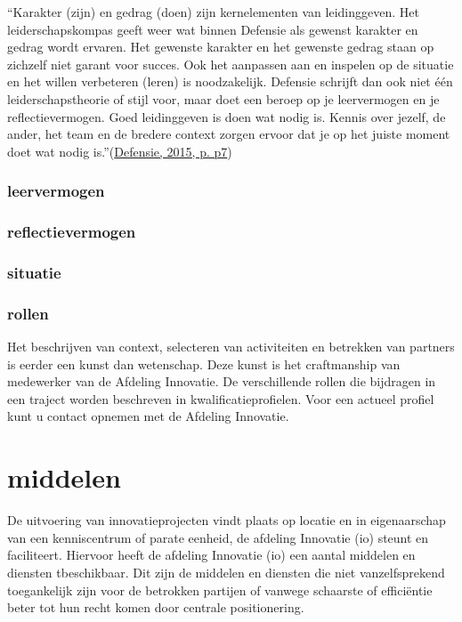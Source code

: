 \documentclass[
]{book}
\begin{document}
``Karakter (zijn) en gedrag (doen) zijn kernelementen van leidinggeven. Het leiderschapskompas geeft weer wat binnen Defensie als gewenst karakter en gedrag wordt ervaren. Het gewenste karakter en het gewenste gedrag staan op zichzelf niet garant voor succes. Ook het aanpassen aan en inspelen op de situatie en het willen verbeteren (leren) is noodzakelijk. Defensie schrijft dan ook niet één leiderschapstheorie of stijl voor, maar doet een beroep op je leervermogen en je reflectievermogen. Goed leidinggeven is doen wat nodig is. Kennis over jezelf, de ander, het team en de bredere context zorgen ervoor dat je op het juiste moment doet wat nodig is.''(\protect\hyperlink{ref-ministerie_van_defensie_visie_2015}{Defensie, 2015, p. p7})

\hypertarget{leervermogen}{%
\subsubsection{leervermogen}\label{leervermogen}}

\hypertarget{reflectievermogen}{%
\subsubsection{reflectievermogen}\label{reflectievermogen}}

\hypertarget{situatie}{%
\subsubsection{situatie}\label{situatie}}

\hypertarget{rollen}{%
\subsubsection{rollen}\label{rollen}}

Het beschrijven van context, selecteren van activiteiten en betrekken van partners is eerder een kunst dan wetenschap. Deze kunst is het craftmanship van medewerker van de Afdeling Innovatie. De verschillende rollen die bijdragen in een traject worden beschreven in kwalificatieprofielen. Voor een actueel profiel kunt u contact opnemen met de Afdeling Innovatie.

\hypertarget{middelen}{%
\section{middelen}\label{middelen}}

De uitvoering van innovatieprojecten vindt plaats op locatie en in eigenaarschap van een kenniscentrum of parate eenheid, de afdeling Innovatie (io) steunt en faciliteert. Hiervoor heeft de afdeling Innovatie (io) een aantal middelen en diensten tbeschikbaar. Dit zijn de middelen en diensten die niet vanzelfsprekend toegankelijk zijn voor de betrokken partijen of vanwege schaarste of efficiëntie beter tot hun recht komen door centrale positionering.
\end{document}
